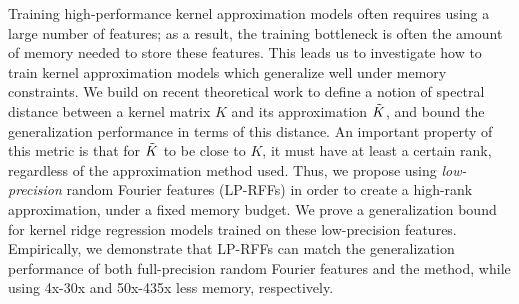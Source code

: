 
Training high-performance kernel approximation models often requires using a large number of features; as a result, the training bottleneck is often the amount of memory needed to store these features. This leads us to investigate how to train kernel approximation models which generalize well under memory constraints. We build on recent theoretical work \citep{avron17,musco17} to define a notion of spectral distance between a kernel matrix $K$ and its approximation $\tilde{K}$, and bound the generalization performance in terms of this distance. An important property of this metric is that for $\tilde{K}$ to be close to $K$, it must have at least a certain rank, regardless of the approximation method used. Thus, we propose using \emph{low-precision} random Fourier features (LP-RFFs) in order to create a high-rank approximation, under a fixed memory budget. We prove a generalization bound for kernel ridge regression models trained on these low-precision features.  Empirically, we demonstrate that LP-RFFs can match the generalization performance of both full-precision random Fourier features and the \Nystrom method, while using 4x-30x and 50x-435x less memory, respectively.


